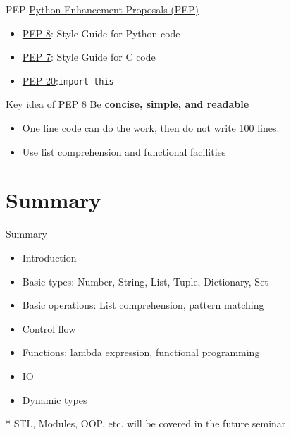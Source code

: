 \documentclass{../TexTemplate/myslide}
\begin{document}
\begin{frame}[fragile]{PEP}
\href{https://www.python.org/dev/peps/}{Python Enhancement Proposals (PEP)}
\begin{itemize}
	\item \href{https://www.python.org/dev/peps/pep-0008/}{PEP 8}: Style Guide for Python code
	\item \href{https://www.python.org/dev/peps/pep-0007/}{PEP 7}: Style Guide for C code
	\item \href{https://www.python.org/dev/peps/pep-0020/}{PEP 20}:\verb'import this'
\end{itemize}
\end{frame}

\begin{frame}{Key idea of PEP 8}
Be \textbf{concise, simple, and readable}
\begin{itemize}
	\item One line code can do the work, then do not write 100 lines.
	\item Use list comprehension and functional facilities
\end{itemize}
\end{frame}

\section{Summary}
\begin{frame}
\sectionpage
\end{frame}

\begin{frame}{Summary}
\begin{itemize}
	\item Introduction
	\item Basic types: Number, String, List, Tuple, Dictionary, Set
	\item Basic operations: List comprehension, pattern matching
	\item Control flow
	\item Functions: lambda expression, functional programming
	\item IO
	\item Dynamic types
\end{itemize}
* STL, Modules, OOP, etc. will be covered in the future seminar
\end{frame}

\end{document}
